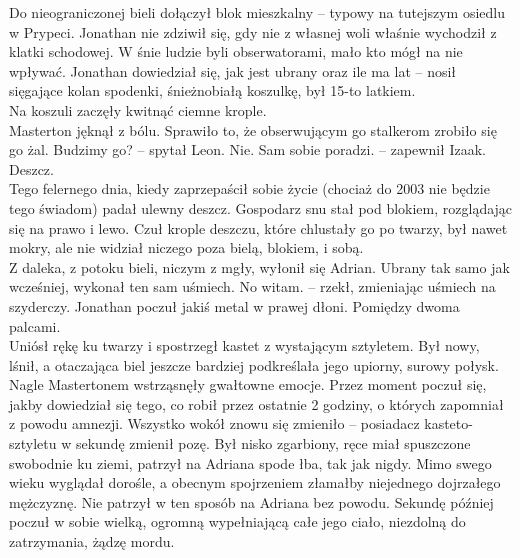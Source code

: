 \documentclass[../MAIN.tex]{subfiles}
\begin{document}
Do nieograniczonej bieli dołączył blok mieszkalny -- typowy na tutejszym osiedlu w Prypeci. Jonathan nie zdziwił się, gdy nie z własnej woli właśnie wychodził z klatki schodowej. W śnie ludzie byli obserwatorami, mało kto mógł na nie wpływać. Jonathan dowiedział się, jak jest ubrany oraz ile ma lat -- nosił sięgające kolan spodenki, śnieżnobiałą koszulkę, był 15-to latkiem. \\
Na koszuli zaczęły kwitnąć ciemne krople. \\
Masterton jęknął z bólu. Sprawiło to, że obserwującym go stalkerom zrobiło się go żal.
\sx Budzimy go? -- spytał Leon.
\xx Nie. Sam sobie poradzi. -- zapewnił Izaak. \qd
%
%
Deszcz.\\
Tego felernego dnia, kiedy zaprzepaścił sobie życie (chociaż do 2003 nie będzie tego świadom) padał ulewny deszcz. Gospodarz snu stał pod blokiem, rozglądając się na prawo i lewo. Czuł krople deszczu, które chlustały go po twarzy, był nawet mokry, ale nie widział niczego poza bielą, blokiem, i sobą. \\
Z daleka, z potoku bieli, niczym z mgły, wyłonił się Adrian. Ubrany tak samo jak wcześniej, wykonał ten sam uśmiech.
\sx No witam. -- rzekł, zmieniając uśmiech na szyderczy. \qd
Jonathan poczuł jakiś metal w prawej dłoni. Pomiędzy dwoma palcami. \\
Uniósł rękę ku twarzy i spostrzegł kastet z wystającym sztyletem. Był nowy,
lśnił, a otaczająca biel jeszcze bardziej podkreślała jego upiorny, surowy połysk.
Nagle Mastertonem wstrząsnęły gwałtowne emocje. Przez moment poczuł się, jakby dowiedział się tego, co robił przez ostatnie 2 godziny, o których zapomniał z powodu amnezji. Wszystko wokół znowu się zmieniło -- posiadacz kasteto-sztyletu w sekundę zmienił pozę. Był nisko zgarbiony, ręce miał spuszczone swobodnie ku ziemi, patrzył na Adriana spode łba, tak jak nigdy. Mimo swego wieku wyglądał dorośle, a obecnym spojrzeniem złamałby niejednego dojrzałego mężczyznę. Nie patrzył w ten sposób na Adriana bez powodu.
Sekundę później poczuł w sobie wielką, ogromną wypełniającą całe jego ciało, niezdolną do zatrzymania, żądzę mordu.
\end{document}
